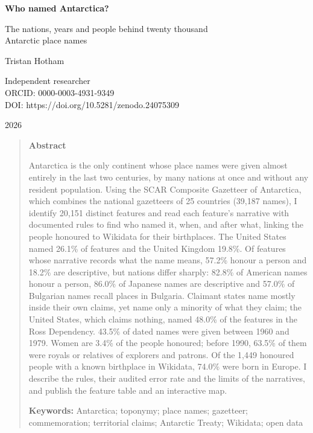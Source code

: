 \documentclass[11pt,a4paper]{article}
\begin{document}
\begin{center}
{\Large\bfseries Who named Antarctica?\par}
\vspace{0.4em}
{\large The nations, years and people behind twenty thousand\\Antarctic place names\par}
\vspace{1.2em}
{\large Tristan Hotham\par}
\vspace{0.3em}
{\small Independent researcher\\
ORCID: 0000-0003-4931-9349\\
DOI: https://doi.org/10.5281/zenodo.24075309\par}
\vspace{0.8em}
2026
\end{center}

\begin{quote}
\small
\begin{center}\textbf{Abstract}\end{center}
Antarctica is the only continent whose place names were given almost entirely in the last two centuries, by many nations at once and without any resident population. Using the SCAR Composite Gazetteer of Antarctica, which combines the national gazetteers of 25 countries (39,187 names), I identify 20,151 distinct features and read each feature's narrative with documented rules to find who named it, when, and after what, linking the people honoured to Wikidata for their birthplaces. The United States named 26.1\% of features and the United Kingdom 19.8\%. Of features whose narrative records what the name means, 57.2\% honour a person and 18.2\% are descriptive, but nations differ sharply: 82.8\% of American names honour a person, 86.0\% of Japanese names are descriptive and 57.0\% of Bulgarian names recall places in Bulgaria. Claimant states name mostly inside their own claims, yet name only a minority of what they claim; the United States, which claims nothing, named 48.0\% of the features in the Ross Dependency. 43.5\% of dated names were given between 1960 and 1979. Women are 3.4\% of the people honoured; before 1990, 63.5\% of them were royals or relatives of explorers and patrons. Of the 1,449 honoured people with a known birthplace in Wikidata, 74.0\% were born in Europe. I describe the rules, their audited error rate and the limits of the narratives, and publish the feature table and an interactive map.

\textbf{Keywords:} Antarctica; toponymy; place names; gazetteer; commemoration; territorial claims; Antarctic Treaty; Wikidata; open data
\end{quote}
\end{document}
